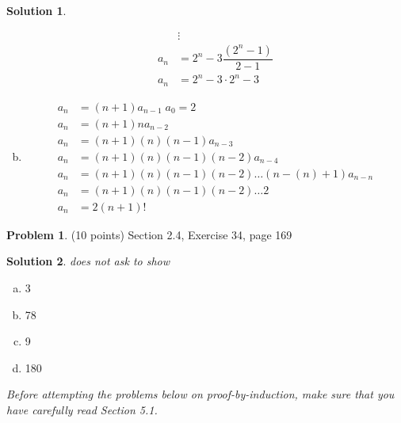 \documentclass{article}
\theoremstyle{definition}
\newtheorem{problem}{Problem}
\newtheorem*{solution}{Solution}
\begin{document}
\begin{solution}
\begin{enumerate}[a)]
\begin{align*}
    &\vdots \\
    a_n &= 2^n - 3\dfrac{(2^n - 1)}{2-1} \\
    a_n &= 2^n -3 \cdot 2^n - 3
  \end{align*}
  \item 
  \begin{align*}
        a_n &= (n+1)a_{n-1} \; a_0 = 2 \\
    a_n &= (n+1)n a_{n-2} \\
    a_n &= (n+1)(n)(n-1) a_{n-3} \\
    a_n &= (n+1)(n)(n-1)(n-2) a_{n-4} \\
    a_n &= (n+1)(n)(n-1)(n-2) \dots (n-(n) + 1)  a_{n-n} \\
    a_n &= (n+1)(n)(n-1)(n-2) \dots 2 \\
    a_n &= 2(n+1)!
  \end{align*}
  
\end{enumerate}
\end{solution}

\begin{problem} (10 points)
Section 2.4, Exercise 34, page 169
\end{problem}
\begin{solution} \textit{does not ask to show}
\begin{enumerate}[a)]
  \item 3
  \item 78
  \item 9
  \item 180
\end{enumerate}
\end{solution}

\noindent
\textsl{Before attempting the problems below on proof-by-induction, make sure that 
you have carefully read Section 5.1.}
\end{document}
